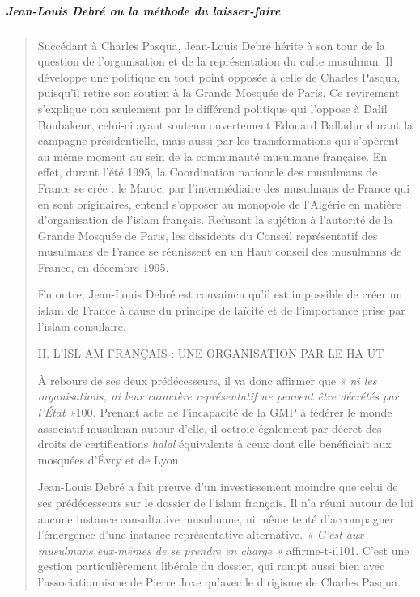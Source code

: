 \hypertarget{jean-louis-debruxe9-ou-la-muxe9thode-du-laisser-faire}{%
\subparagraph{Jean-Louis Debré ou la méthode du
laisser-faire}\label{jean-louis-debruxe9-ou-la-muxe9thode-du-laisser-faire}}

\begin{quote}
Succédant à Charles Pasqua, Jean-Louis Debré hérite à son tour de la
question de l'organisation et de la représentation du culte musulman. Il
développe une politique en tout point opposée à celle de Charles Pasqua,
puisqu'il retire son soutien à la Grande Mosquée de Paris. Ce revirement
s'explique non seulement par le différend politique qui l'oppose à Dalil
Boubakeur, celui-ci ayant soutenu ouvertement Edouard Balladur durant la
campagne présidentielle, mais aussi par les transformations qui
s'opèrent au même moment au sein de la communauté musulmane française.
En effet, durant l'été 1995, la Coordination nationale des musulmans de
France se crée : le Maroc, par l'intermédiaire des musulmans de France
qui en sont originaires, entend s'opposer au monopole de l'Algérie en
matière d'organisation de l'islam français. Refusant la sujétion à
l'autorité de la Grande Mosquée de Paris, les dissidents du Conseil
représentatif des musulmans de France se réunissent en un Haut conseil
des musulmans de France, en décembre 1995.

En outre, Jean-Louis Debré est convaincu qu'il est impossible de créer
un islam de France à cause du principe de laïcité et de l'importance
prise par l'islam consulaire.

II. L'ISL AM FRANÇAIS : UNE ORGANISATION PAR LE HA UT

À rebours de ses deux prédécesseurs, il va donc affirmer que \emph{« ni
les organisations, ni leur caractère représentatif ne peuvent être
décrétés par l'État »}100\emph{.} Prenant acte de l'incapacité de la GMP
à fédérer le monde associatif musulman autour d'elle, il octroie
également par décret des droits de certifications \emph{halal}
équivalents à ceux dont elle bénéficiait aux mosquées d'Évry et de Lyon.

Jean-Louis Debré a fait preuve d'un investissement moindre que celui de
ses prédécesseurs sur le dossier de l'islam français. Il n'a réuni
autour de lui aucune instance consultative musulmane, ni même tenté
d'accompagner l'émergence d'une instance représentative alternative.
\emph{« C'est aux musulmans eux-mêmes de se prendre en charge »}
affirme-t-il101. C'est une gestion particulièrement libérale du dossier,
qui rompt aussi bien avec l'associationnisme de Pierre Joxe qu'avec le
dirigisme de Charles Pasqua.
\end{quote}

